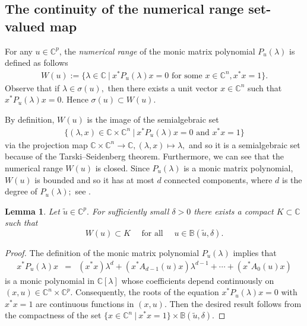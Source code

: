 \documentclass[10pt,reqno]{amsart}
\theoremstyle{break-italic}
\theoremstyle{break-italic}
\theoremstyle{break-italic}
\theoremstyle{break-italic}
\theoremstyle{break-italic}
\theoremstyle{break-italic}
\theoremstyle{break-italic}
\theoremstyle{break-italic}
\newtheorem{lemma}[satz]{Lemma}
\theoremstyle{break-roman}
\theoremstyle{standard}
\theoremstyle{varthm-roman}
\theoremstyle{varthm-italic}
\theoremstyle{varthm-roman-break}
\theoremstyle{varthm-italic-break}
\theoremstyle{varthm-roman-no-punctuation}
\theoremstyle{varthm-italic-no-punctuation}
\numberwithin{equation}{section}
\begin{document}
\subsection{The continuity of the numerical range set-valued map}

For any $u\in \mathbb C^p$, the {\em numerical range} of the monic matrix polynomial $P_{u}(\lambda)$ is defined as follows
\begin{eqnarray*}
W(u) := \{ \lambda \in \mathbb{C} \ | \ x^* P_{u}(\lambda) x = 0 \textrm{ for some } x \in \mathbb{C}^n, x^* x = 1\}.
\end{eqnarray*}
Observe that if $\lambda \in \sigma(u),$ then there exists a unit vector $x \in \mathbb{C}^n$ such that $x^* P_{u}(\lambda) x = 0.$ Hence $\sigma(u) \subset W(u).$

By definition, $W(u)$ is the image of the semialgebraic set
\begin{eqnarray*}
\{ (\lambda, x) \in \mathbb{C} \times \mathbb{C}^n \ | \ x^* P_{u}(\lambda) x = 0 \textrm{ and } x^* x = 1\}
\end{eqnarray*}
via the projection map $\mathbb{C} \times \mathbb{C}^n \rightarrow \mathbb{C}, (\lambda, x) \mapsto \lambda,$ and so it is a semialgebraic set because of the Tarski--Seidenberg theorem. Furthermore, we can see that the numerical range $W(u)$ is closed.
Since $P_u(\lambda)$ is a monic matrix polynomial, $W(u)$ is bounded and so it has at most $d$ connected components, where $d$ is the degree of $P_u(\lambda);$ see \cite[Theorems~2.2 and 2.3]{Li1994}.

\begin{lemma}\label{Lemma34}
Let $\tilde{u} \in \mathbb{C}^p.$ For   sufficiently small $\delta > 0$ there exists a compact $K \subset \mathbb{C}$ such that
$$W(u) \subset K \quad \textrm{ for all } \quad u \in \mathbb{B}(\tilde{u}, \delta).$$
\end{lemma}
\begin{proof}
The definition of the monic matrix polynomial $P_u(\lambda)$ implies that
\begin{eqnarray*}
x^* P_{u}(\lambda) x  &=& \left(x^* x\right) \lambda^d  + \left( x^* A_{d - 1}(u) x \right) \lambda^{d - 1}  + \cdots + \left( x^* A_{0}(u) x \right)
\end{eqnarray*}
is a monic polynomial in $\mathbb{C}[\lambda]$ whose coefficients depend continuously on $(x, u) \in \mathbb{C}^n \times \mathbb{C}^p.$ Consequently, the roots of  the equation $x^* P_{u}(\lambda) x = 0$ with $x^* x = 1$ are continuous functions in $(x, u).$ Then the desired result follows  from the compactness of the set $\{x \in \mathbb{C}^n \ | \ x^* x = 1\} \times \mathbb{B}(\tilde{u}, \delta).$
\end{proof}
\end{document}
